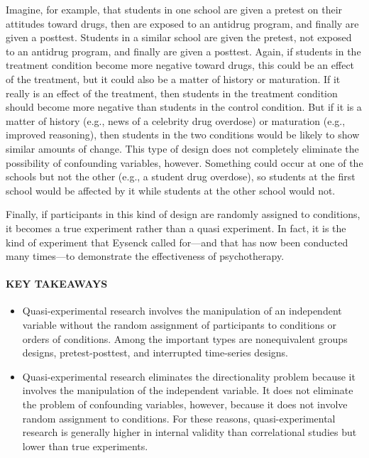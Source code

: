 \documentclass[
]{krantz}
\providecommand{\tightlist}{%
  \setlength{\itemsep}{0pt}\setlength{\parskip}{0pt}}
\begin{document}
Imagine, for example, that students in one school are given a pretest on their attitudes toward drugs, then are exposed to an antidrug program, and finally are given a posttest. Students in a similar school are given the pretest, not exposed to an antidrug program, and finally are given a posttest. Again, if students in the treatment condition become more negative toward drugs, this could be an effect of the treatment, but it could also be a matter of history or maturation. If it really is an effect of the treatment, then students in the treatment condition should become more negative than students in the control condition. But if it is a matter of history (e.g., news of a celebrity drug overdose) or maturation (e.g., improved reasoning), then students in the two conditions would be likely to show similar amounts of change. This type of design does not completely eliminate the possibility of confounding variables, however. Something could occur at one of the schools but not the other (e.g., a student drug overdose), so students at the first school would be affected by it while students at the other school would not.

Finally, if participants in this kind of design are randomly assigned to conditions, it becomes a true experiment rather than a quasi experiment. In fact, it is the kind of experiment that Eysenck called for---and that has now been conducted many times---to demonstrate the effectiveness of psychotherapy.

\hypertarget{key-takeaways-25}{%
\paragraph*{KEY TAKEAWAYS}\label{key-takeaways-25}}

\begin{itemize}
\tightlist
\item
  Quasi-experimental research involves the manipulation of an independent variable without the random assignment of participants to conditions or orders of conditions. Among the important types are nonequivalent groups designs, pretest-posttest, and interrupted time-series designs.
\item
  Quasi-experimental research eliminates the directionality problem because it involves the manipulation of the independent variable. It does not eliminate the problem of confounding variables, however, because it does not involve random assignment to conditions. For these reasons, quasi-experimental research is generally higher in internal validity than correlational studies but lower than true experiments.
\end{itemize}
\end{document}
